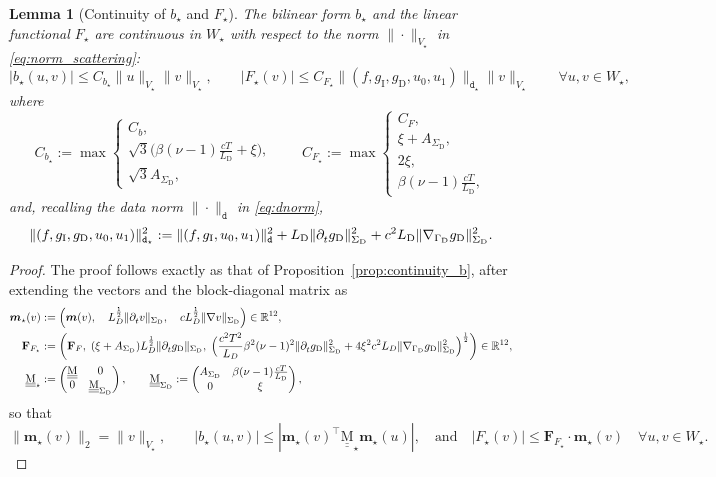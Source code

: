 \documentclass[a4paper]{article}
\theoremstyle{plain}
\newtheorem{lemma}[theorem]{Lemma}
\theoremstyle{definition}
\newcommand{\Grad}[1]{\nabla #1}
\newcommand{\TimeDer}{{\partial^{}_t}}
\newcommand{\vect}[1]{\bm{#1}}
\newcommand{\mat}[1]{\underline{\underline{\mathrm{#1}}}}
\newcommand{\LD}{L_{\mathrm D}}
\newcommand{\Vs}{{V_{\star}}}
\newcommand{\Ws}{{W_{\star}}}
\newcommand{\GD}{{\Gamma_{\mathrm D}}}
\newcommand{\SD}{{\Sigma_{\mathrm D}}}
\newcommand{\gD}{{g_{\mathrm D}}}
\newcommand{\gI}{{g_{\mathrm I}}}
\newcommand{\GradGD}{{\Grad_{\GD}}}
\begin{document}
\begin{lemma}[Continuity of $b_\star$ and $F_\star$]
The bilinear form $b_\star$ and the linear functional $F_\star$ are continuous in $\Ws$ with respect to the norm $\|\cdot\|_\Vs$ in \eqref{eq:norm_scattering}:
$$
|b_\star(u,v)|\le C_{b_\star} \|u\|_\Vs\|v\|_\Vs,
\qquad
|F_\star (v)|\leq C_{F_\star} \|(f, \gI, \gD, u_0, u_1)\|_{\mathtt{d}_\star} \|v\|_\Vs
\qquad
\forall u,v\in \Ws,
$$
where
\begin{equation*}C_{b_\star} := \max
\begin{cases}
C_b,\\
	\sqrt3\big(\beta  (\nu-1) \frac{c T}{\LD} + \xi\big),  \\
	\sqrt3 A_\SD,
\end{cases}
\qquad
C_{F_\star}:=\max \begin{cases}C_F,\\
	\xi+A_\SD,\\
	2\xi,\\
	\beta (\nu-1) \frac{cT}{\LD},
\end{cases}
\end{equation*}
and, recalling the data norm $\|\cdot\|_\mathtt{d}$ in \eqref{eq:dnorm},
\begin{align*}
\|(f, \gI, \gD, u_0, u_1)\|^2_{\mathtt d_\star} := \|(f, \gI, u_0, u_1)\|^2_\mathtt{d} + \LD \|\TimeDer \gD\|^2_\SD + c^2\LD \|\GradGD \gD\|^2_\SD.
\end{align*}
\end{lemma}
\begin{proof}
The proof follows exactly as that of Proposition~\ref{prop:continuity_b}, after extending the vectors and the block-diagonal matrix as
\begin{align*}
\vect{m}_\star(v)&:=\Big(\vect{m}(v),\quad L_D^{\frac12}\|\TimeDer v\|_\SD,\quad c L_D^{\frac12}\|\nabla v\|_\SD\Big)\in \mathbb{R}^{12},\\
\mathbf F_{F_\star}&:=\bigg(\mathbf F_F,\;
(\xi +A_\SD)L_D^{\frac12}\|\TimeDer \gD\|_\SD,\;
\Big(\frac{c^2T^2}{L_D}\beta^2(\nu-1)^2\|\TimeDer\gD\|_\SD^2 + 4\xi^2c^2L_D\|\GradGD\gD\|_\SD^2\Big)^{\frac12}\bigg)\in \mathbb{R}^{12},\\
\mat{M}_\star&:=
\left(\begin{matrix}\mat{M} &0 \\ 0 & \mat{M}_\SD\end{matrix}\right),\qquad
\mat{M}_\SD :=
\left(\begin{matrix}A_\SD & \beta (\nu-1) \frac{cT}{\LD}\\0 & \xi\end{matrix}\right),
\end{align*}
so that
$$
\|\vect{m}_\star(v)\|_2=\|v\|_\Vs, \qquad
|b_\star(u,v)|\le |\vect{m}_\star(v)^\top \mat{M}_\star\vect{m}_\star(u)|,\quad \text{and} \quad
|F_\star(v)|\le \mathbf F_{F_\star}\cdot\vect{m}_\star(v)
\quad \forall u,v\in \Ws.
$$
\end{proof}
\end{document}
